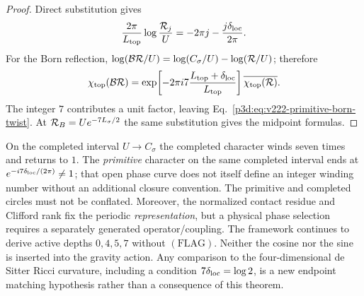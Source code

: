 \documentclass[12pt,a4paper]{article}
\begin{document}
\begin{proof}
Direct substitution gives
\[
 \frac{2\pi}{L_{\rm top}}\log\frac{\mathcal R_j}{U}
   =-2\pi j-\frac{j\delta_{\rm loc}}{2\pi}.
\]
For the Born reflection,
$\log(\mathcal B\mathcal R/U)=\log(C_\sigma/U)-\log(\mathcal R/U)$;
therefore
\[
 \chi_{\rm top}(\mathcal B\mathcal R)
 =\exp\!\left[-2\pi i7
    \frac{L_{\rm top}+\delta_{\rm loc}}{L_{\rm top}}\right]
      \overline{\chi_{\rm top}(\mathcal R)}.
\]
The integer $7$ contributes a unit factor, leaving
Eq.~\eqref{p3d:eq:v222-primitive-born-twist}.  At
$\mathcal R_B=Ue^{-7L_\sigma/2}$ the same substitution gives the
midpoint formulas.
\end{proof}

\begin{remark}
\label{p3d:rem:v222-phase-nonaction-firewall}
On the completed interval $U\to C_\sigma$ the completed character
winds seven times and returns to $1$.  The \emph{primitive} character
on the same completed interval ends at
$e^{-i7\delta_{\rm loc}/(2\pi)}\ne1$; that open phase curve does
not itself define an integer winding number without an additional
closure convention.  The primitive and completed circles must not be
conflated.  Moreover, the normalized contact residue and Clifford rank
fix the periodic \emph{representation}, but a physical phase selection
requires a separately generated operator/coupling.  The framework
continues to derive active depths $0,4,5,7$ without $(\mathrm{FLAG})$.
Neither the cosine nor the sine is inserted into the gravity action.
Any comparison to the four-dimensional de Sitter Ricci curvature,
including a condition $7\delta_{\rm loc}=\log2$, is a new endpoint
matching hypothesis rather than a consequence of this theorem.
\end{remark}
\end{document}
